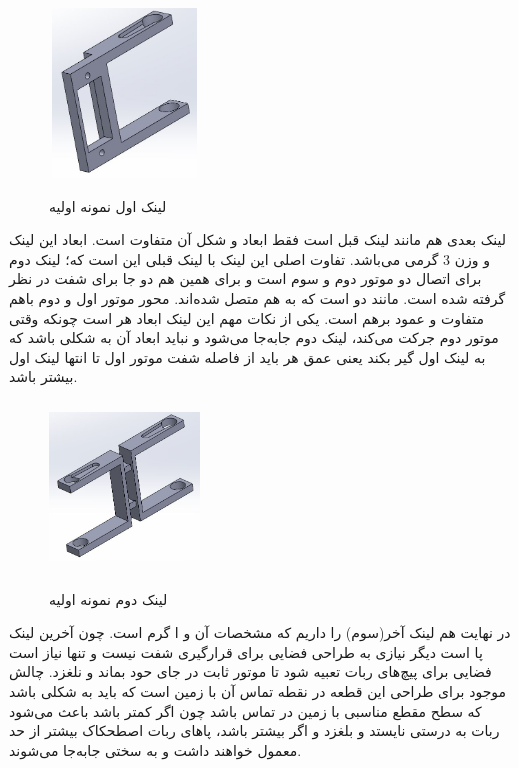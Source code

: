 	\begin{figure}[!h]	
	\vspace{0.2cm}
	\centering
	\includegraphics[height=4.5cm,width=4cm]{./Images/CH2/Link1_First.JPG}
	‌\caption{لینک اول نمونه اولیه}
	\label{لینک اول نمونه اولیه}
	\end{figure}
	
لینک بعدی هم مانند لینک قبل است فقط ابعاد و شکل آن متفاوت است. ابعاد این لینک  و وزن 3 گرمی می‌باشد. تفاوت اصلی این لینک با لینک قبلی این است که؛ لینک دوم برای اتصال دو موتور دوم و سوم است و برای همین هم دو جا برای شفت در نظر گرفته شده است. مانند دو  است که به هم متصل شده‌اند. محور موتور اول و دوم باهم متفاوت و عمود برهم است. یکی از نکات مهم این لینک ابعاد هر  است چونکه وقتی موتور دوم جرکت می‌کند، لینک دوم جابه‌جا می‌شود و نباید ابعاد آن به شکلی باشد که به لینک اول گیر بکند یعنی عمق هر  باید از فاصله شفت موتور اول تا انتها لینک اول بیشتر باشد.

	\begin{figure}[!h]	
	\vspace{0.2cm}
	\centering
	\includegraphics[height=4.5cm,width=4cm]{./Images/CH2/Link2_First.JPG}
	‌\caption{لینک دوم نمونه اولیه}
	\label{لینک دوم نمونه اولیه}
	\end{figure}
	
در نهایت هم لینک آخر(سوم) را داریم که مشخصات آن  و ا گرم است. چون آخرین لینک پا است دیگر نیازی به طراحی فضایی برای قرارگیری شفت نیست و تنها نیاز است فضایی برای پیچ‌های ربات تعبیه شود تا موتور ثابت در جای حود بماند و نلغزد. چالش موجود برای طراحی این قطعه در نقطه تماس آن با زمین است که باید به شکلی باشد که سطح مقطع مناسبی با زمین در تماس باشد چون اگر کمتر باشد باعث می‌شود ربات به درستی نایستد و بلغزد و اگر بیشتر باشد، پاهای ربات اصطحکاک بیشتر از حد معمول خواهند داشت و به سختی جابه‌جا می‌شوند.


